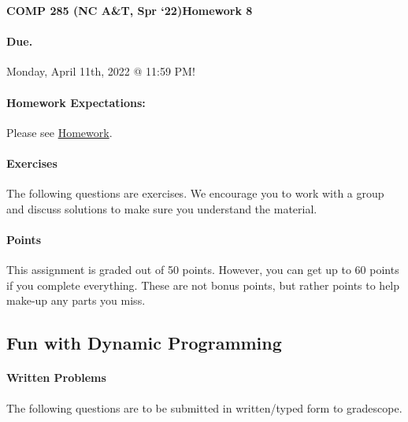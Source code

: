 \documentclass [12pt]{article}
\begin{document}
 

{\LARGE \textbf{COMP 285 (NC A\&T, Spr `22)}\hfill \textbf{Homework 8} } 
\vspace{1em} 
\begin{Instruction} 

\paragraph{Due.} Monday, April 11th, 2022 @ 11:59 PM!
\end{Instruction} 

\vspace{1em} 
\begin{Instruction} \paragraph{Homework Expectations:} Please see \href{https://www.comp285.ml/homework/#general-homework-information}{Homework}.
\end{Instruction}

\vspace{1em} 
\begin{Instruction} 

\paragraph{Exercises} The following questions are exercises. We encourage you to work with a group and discuss solutions to make sure you understand the material.

\paragraph{Points} This assignment is graded out of 50 points. However, you can get up to 60 points if you complete everything. These are not bonus points, but rather points to help make-up any parts you miss.

\end{Instruction} 

\begin{centering}
\section*{Fun with Dynamic Programming}
\end{centering}

\begin{Instruction}

\paragraph{Written Problems} The following questions are to be submitted in written/typed form to gradescope.

\end{Instruction}
\end{document}
